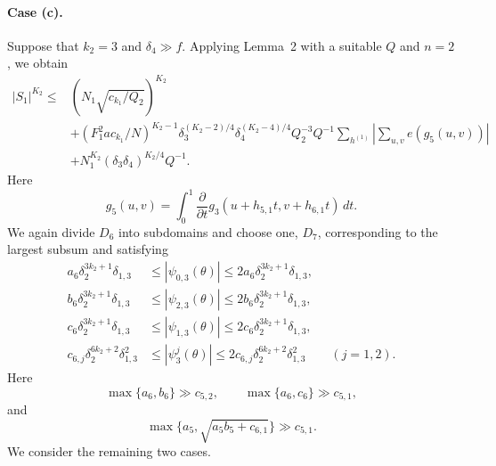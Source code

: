 \documentclass[10pt]{article}
\begin{document}
\paragraph{Case (c).}
Suppose that $k_2=3$ and $\delta_4\gg f$. Applying Lemma~2 with a suitable $Q$ and $n=2$, we obtain
\begin{equation}
\begin{aligned}
  |S_1|^{K_2}\leqslant{}&
  \left(N_1\sqrt{c_{k_1}/Q_2}\right)^{K_2}\\
  &+(F_1^2ac_{k_1}/N)^{K_2-1}
  \delta_3^{(K_2-2)/4}\delta_4^{(K_2-4)/4}Q_2^{-3}Q^{-1}
  \sum_{h^{(1)}}\left|\sum_{u,v}e(g_5(u,v))\right|\\
  &+N_1^{K_2}(\delta_3\delta_4)^{K_2/4}Q^{-1}.
\end{aligned}
\tag{11}
\end{equation}
Here
\[
  g_5(u,v)=\int_0^1\frac{\partial}{\partial t}
  g_3(u+h_{5,1}t,v+h_{6,1}t)\,dt.
\]
We again divide $D_6$ into subdomains and choose one, $D_7$, corresponding to the largest subsum and satisfying
\[
\begin{aligned}
  a_6\delta_2^{3k_2+1}\delta_{1,3}
  &\leqslant|\psi_{0,3}(\theta)|
   \leqslant2a_6\delta_2^{3k_2+1}\delta_{1,3},\\
  b_6\delta_2^{3k_2+1}\delta_{1,3}
  &\leqslant|\psi_{2,3}(\theta)|
   \leqslant2b_6\delta_2^{3k_2+1}\delta_{1,3},\\
  c_6\delta_2^{3k_2+1}\delta_{1,3}
  &\leqslant|\psi_{1,3}(\theta)|
   \leqslant2c_6\delta_2^{3k_2+1}\delta_{1,3},\\
  c_{6,j}\delta_2^{6k_2+2}\delta_{1,3}^2
  &\leqslant|\psi_3^j(\theta)|
   \leqslant2c_{6,j}\delta_2^{6k_2+2}\delta_{1,3}^2
  \qquad(j=1,2).
\end{aligned}
\]
Here
\[
  \max\{a_6,b_6\}\gg c_{5,2},
  \qquad \max\{a_6,c_6\}\gg c_{5,1},
\]
and
\[
  \max\{a_5,\sqrt{a_5b_5+c_{6,1}}\}\gg c_{5,1}.
\]
We consider the remaining two cases.
\end{document}
